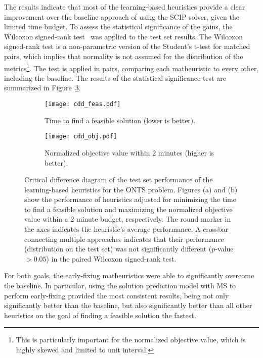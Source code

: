 The results indicate that most of the learning-based heuristics provide a clear improvement over the baseline approach of using the SCIP solver, given the limited time budget.
To assess the statistical significance of the gains, the Wilcoxon signed-rank test~\cite{wilcoxon_1945} was applied to the test set results.
The Wilcoxon signed-rank test is a non-parametric version of the Student's t-test for matched pairs, which implies that normality is not assumed for the distribution of the metrics\footnote{This is particularly important for the normalized objective value, which is highly skewed and limited to unit interval.}.
The test is applied in pairs, comparing each matheuristic to every other, including the baseline.
The results of the statistical significance test are summarized in Figure~\ref{fig:cdds}.

\begin{figure}[h]
    \centering
    \begin{subfigure}{0.99\textwidth}
        \centering
        \texttt{[image: cdd\_feas.pdf]}
        \caption{Time to find a feasible solution (lower is better).}
        \label{fig:cdd-feas}
    \end{subfigure}
    \begin{subfigure}{0.99\textwidth}
        \centering
        \texttt{[image: cdd\_obj.pdf]}
        \caption{Normalized objective value within 2 minutes (higher is better).}
        \label{fig:cdd-obj}
    \end{subfigure}
    \caption{%
    Critical difference diagram of the test set performance of the learning-based heuristics for the ONTS problem.
    Figures (a) and (b) show the performance of heuristics adjusted for minimizing the time to find a feasible solution and maximizing the normalized objective value within a 2 minute budget, respectively.
    The round marker in the axes indicates the heuristic's average performance.
    A crossbar connecting multiple approaches indicates that their performance (distribution on the test set) was not significantly different ($p$-value $>0.05$) in the paired Wilcoxon signed-rank test.
    }
    \label{fig:cdds}
\end{figure}

For both goals, the early-fixing matheuristics were able to significantly overcome the baseline.
In particular, using the solution prediction model with MS to perform early-fixing provided the most consistent results, being not only significantly better than the baseline, but also significantly better than all other heuristics on the goal of finding a feasible solution the fastest.

